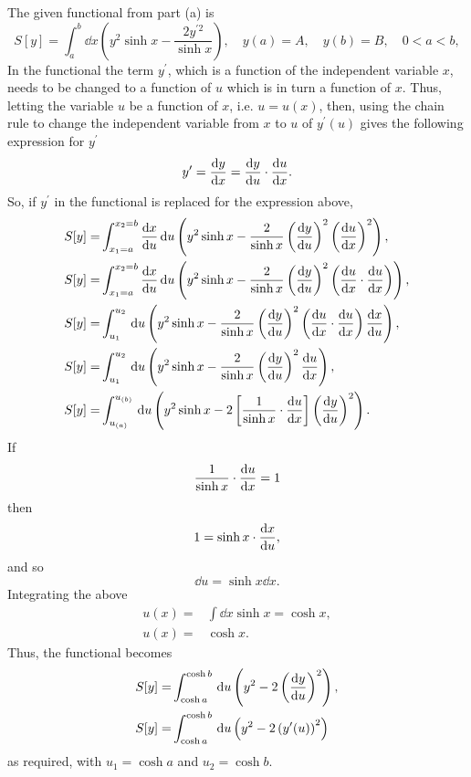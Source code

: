 The given functional from part (a) is
\[
	S[y] = \int_a^b \dd x\left(y^2\sinh x -\frac{2y^{\prime 2}}{\sinh x}\right),\quad y(a) = A,\quad y(b) = B,\quad 0< a < b,
\]
In the functional the term $y^\prime$, which is a function of the independent variable $x$, needs to be changed to a function of $u$ which is in turn a function of $x$. Thus, letting the variable $u$ be a function of $x$, i.e. $u=u(x)$, then, using the chain rule to change the independent variable from $x$ to $u$ of $y^\prime(u)$ gives the following expression for $y^\prime$
\[
	y^\prime = \frac{\mathrm{d}y}{\mathrm{d}x} = \frac{\mathrm{d}y}{\mathrm{d}u}\cdot\frac{\mathrm{d}u}{\mathrm{d}x}.
\]
So, if $y^\prime$ in the functional is replaced for the expression above, 
\begin{equation*}
\begin{split}
	S[y] =& \int_{x_1=a}^{x_2=b}\frac{\mathrm{d}x}{\mathrm{d}u}\, \mathrm{d} u\left(y^2\sinh x-\frac{2}{\sinh x}\left(\frac{\mathrm{d}y}{\mathrm{d}u}\right)^2\left(\frac{\mathrm{d}u}{\mathrm{d}x}\right)^2\right),\\
	S[y] =& \int_{x_1=a}^{x_2=b}\frac{\mathrm{d}x}{\mathrm{d}u}\, \mathrm{d} u\left(y^2\sinh x-\frac{2}{\sinh x}\left(\frac{\mathrm{d}y}{\mathrm{d}u}\right)^2\left(\frac{\mathrm{d}u}{\mathrm{d}x}\cdot\frac{\mathrm{d}u}{\mathrm{d}x}\right)\right),\\
	S[y] =& \int_{u_1}^{u_2}\, \mathrm{d} u\left(y^2\sinh x-\frac{2}{\sinh x}\left(\frac{\mathrm{d}y}{\mathrm{d}u}\right)^2\left(\frac{\mathrm{d}u}{\mathrm{d}x}\cdot\frac{\mathrm{d}u}{\mathrm{d}x}\right)\frac{\mathrm{d}x}{\mathrm{d}u}\right),\\
	S[y] =& \int_{u_1}^{u_2}\, \mathrm{d} u\left(y^2\sinh x-\frac{2}{\sinh x}\left(\frac{\mathrm{d}y}{\mathrm{d}u}\right)^2\frac{\mathrm{d}u}{\mathrm{d}x}\right),\\
	S[y] =& \int_{u_{(a)}}^{u_{(b)}}\, \mathrm{d} u\left(y^2\sinh x-2\left[\frac{1}{\sinh x}\cdot\frac{\mathrm{d}u}{\mathrm{d}x}\right]\left(\frac{\mathrm{d}y}{\mathrm{d}u}\right)^2\right).
\end{split}
\end{equation*}
If
\[
	\frac{1}{\sinh x}\cdot\frac{\mathrm{d}u}{\mathrm{d}x} = 1
\]
then
\[
	1 = \sinh x\cdot\frac{\mathrm{d}x}{\mathrm{d}u},
\]
and so
\[
	\dd u = \sinh x \dd x.
\]
Integrating the above
\begin{equation*}
\begin{split}
	u(x) =& \int \dd x \sinh x = \cosh x,\\
	u(x) =& \cosh x.
\end{split}
\end{equation*}
Thus, the functional becomes
\begin{align*}
	S[y] =& \int_{\cosh a}^{\cosh b}\, \mathrm{d} u \left(y^2 -2\left(\frac{\mathrm{d}y}{\mathrm{d}u}\right)^2\right),\\
	S[y] =& \int_{\cosh a}^{\cosh b}\, \mathrm{d} u \left(y^2-2\left(y^\prime(u)\right)^2\right)
\end{align*}
as required, with $u_1=\cosh a$ and $u_2=\cosh b$.